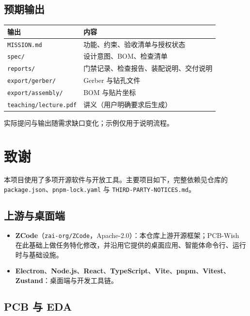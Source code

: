 \documentclass[11pt,a4paper]{ctexart}
\newcommand{\code}[1]{\texttt{\small #1}}
\begin{document}
\subsection{预期输出}

\begin{center}
\small
\begin{tabularx}{\linewidth}{@{}>{\RaggedRight\arraybackslash}p{6.3cm} >{\RaggedRight\arraybackslash}X@{}}
\toprule
\rowcolor{okbg}输出 & 内容 \\
\midrule
\code{MISSION.md} & 功能、约束、验收清单与授权状态 \\
\code{spec/} & 设计意图、BOM、检查清单 \\
\code{reports/} & 门禁记录、检查报告、装配说明、交付说明 \\
\code{export/gerber/} & Gerber 与钻孔文件 \\
\code{export/assembly/} & BOM 与贴片坐标 \\
\code{teaching/lecture.pdf} & 讲义（用户明确要求后生成） \\
\bottomrule
\end{tabularx}
\end{center}

实际提问与输出随需求缺口变化；示例仅用于说明流程。

\section{致谢}

本项目使用了多项开源软件与开放工具。主要项目如下，完整依赖见仓库的 \code{package.json}、\code{pnpm-lock.yaml} 与 \code{THIRD-PARTY-NOTICES.md}。

\subsection{上游与桌面端}

\begin{itemize}
  \item \textbf{ZCode}（\code{zai-org/ZCode}，Apache-2.0）：本仓库上游开源框架；PCB-Wish 在此基础上做任务特化修改，并沿用它提供的桌面应用、智能体命令行、运行时与基础设施。
  \item \textbf{Electron}、\textbf{Node.js}、\textbf{React}、\textbf{TypeScript}、\textbf{Vite}、\textbf{pnpm}、\textbf{Vitest}、\textbf{Zustand}：桌面端与开发工具链。
\end{itemize}

\subsection{PCB 与 EDA}
\end{document}
